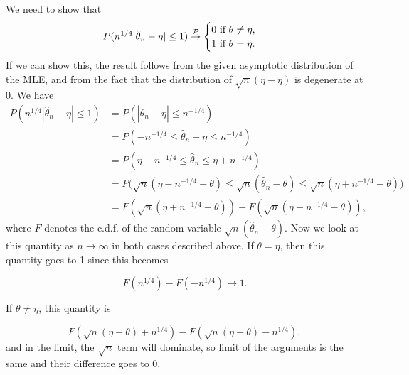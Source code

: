 \documentclass[12pt]{exam}
\begin{document}
 We need to show that 
$$P(n^{1/4}|\hat{\theta}_n - \eta| \leq 1) \overset{\cal P}{\to}
\begin{cases} 0 \text{ if } \theta \ne \eta, \\
1 \text{ if } \theta = \eta.
\end{cases}$$
If we can show this, the result follows from the given asymptotic distribution of the MLE, and from the fact that the distribution of $\sqrt{n}(\eta-\eta)$ is degenerate at 0. We have
$$\begin{aligned}
P(n^{1/4}|\hat{\theta}_n - \eta| \leq 1) &= P(|\hat{\theta}_n - \eta| \leq n^{-1/4})\\
&= P(-n^{-1/4} \leq \hat{\theta}_n - \eta \leq n^{-1/4})\\
&=P(\eta - n^{-1/4} \leq \hat{\theta}_n \leq \eta + n^{-1/4})\\
&=P\big(\sqrt{n}(\eta - n^{-1/4} - \theta) \leq \sqrt{n}(\hat{\theta}_n-\theta) \leq \sqrt{n}(\eta + n^{-1/4} - \theta)\big)\\
&=F(\sqrt{n}(\eta + n^{-1/4} - \theta))-F(\sqrt{n}(\eta - n^{-1/4} - \theta)),
\end{aligned}$$
where $F$ denotes the c.d.f. of the random variable $\sqrt{n}(\hat{\theta}_n - \theta)$. Now we look at this quantity as $n\to\infty$ in both cases described above. If $\theta=\eta$, then this quantity goes to 1 since this becomes

$$F(n^{1/4})-F(-n^{1/4})\to 1.$$

\noindent If $\theta \neq \eta$, this quantity is

$$F(\sqrt{n}(\eta-\theta) + n^{1/4}) - F(\sqrt{n}(\eta-\theta) - n^{1/4}),$$
and in the limit, the $\sqrt{n}$ term will dominate, so limit of the arguments is the same and their difference goes to 0.

\vspace*{1cm}
\end{document}
